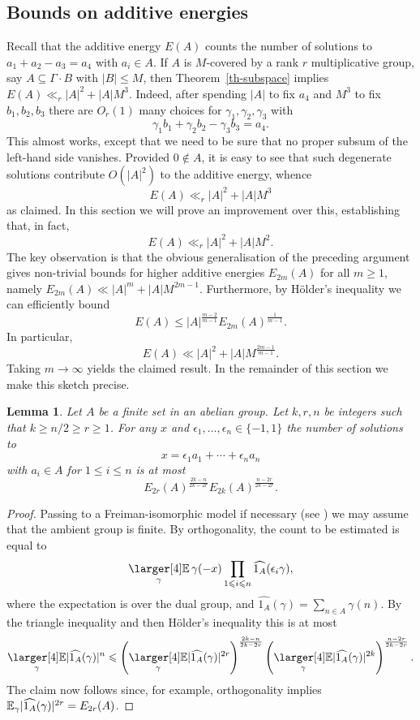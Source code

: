 \documentclass{amsart}
\renewcommand{\leq}{\leqslant}
\renewcommand{\geq}{\geqslant}
\newcommand*{\bbe}{
  \mathop{
    \mathchoice{\vcenter{\hbox{\larger[4]$\mathbb{E}$}}}
               {\kern0pt\mathbb{E}}
               {\kern0pt\mathbb{E}}
               {\kern0pt\mathbb{E}}
  }\displaylimits
}
\newcommand{\abs}[1]{\left\lvert #1\right\rvert}
\newcommand{\Abs}[1]{\lvert #1\rvert}
\newcommand{\brac}[1]{\left( #1\right)}
\newtheorem{lemma}{Lemma}
\theoremstyle{definition}
\begin{document}
\subsection{Bounds on additive energies}

Recall that the additive energy $E(A)$ counts the number of solutions to $a_1+a_2-a_3=a_4$ with $a_i\in A$. If $A$ is $M$-covered by a rank $r$ multiplicative group, say $A\subseteq \Gamma\cdot B$ with $\abs{B}\leq M$, then Theorem~\ref{th-subspace} implies $E(A)\ll_r \abs{A}^2+\abs{A}M^3$. Indeed, after spending $\abs{A}$ to fix $a_4$ and $M^3$ to fix $b_1,b_2,b_3$ there are $O_r(1)$ many choices for $\gamma_1,\gamma_2,\gamma_3$ with
\[\gamma_1b_1+\gamma_2b_2-\gamma_3b_3=a_4.\]
This almost works, except that we need to be sure that no proper subsum of the left-hand side vanishes. Provided $0\not\in A$, it is easy to see that such degenerate solutions contribute $O(\abs{A}^2)$ to the additive energy, whence
\[E(A) \ll_r \abs{A}^2+\abs{A}M^3\]
as claimed. In this section we will prove an improvement over this, establishing that, in fact,
\[E(A) \ll_r \abs{A}^2+\abs{A}M^2.\]
The key observation is that the obvious generalisation of the preceding argument gives non-trivial bounds for higher additive energies $E_{2m}(A)$ for all $m\geq 1$, namely $E_{2m}(A) \ll \abs{A}^m+\abs{A}M^{2m-1}$. Furthermore, by H\"{o}lder's inequality we can efficiently bound 
\[E(A)\leq \abs{A}^{\frac{m-2}{m-1}}E_{2m}(A)^{\frac{1}{m-1}}.\] 
In particular,
\[E(A) \ll \abs{A}^2+\abs{A}M^{\frac{2m-1}{m-1}}.\]
Taking $m\to \infty$ yields the claimed result. In the remainder of this section we make this sketch precise. 

\begin{lemma}\label{lem-energies}
Let $A$ be a finite set in an abelian group. Let $k,r,n$ be integers such that $k\geq n/2\geq r\geq 1$. For any $x$ and $\epsilon_1,\ldots,\epsilon_n\in \{-1,1\}$ the number of solutions to
\[x=\epsilon_1a_1+\cdots+\epsilon_na_n\]
with $a_i\in A$ for $1\leq i\leq n$ is at most
\[E_{2r}(A)^{\frac{2k-n}{2k-2r}}E_{2k}(A)^{\frac{n-2r}{2k-2r}}.\]
\end{lemma}
\begin{proof}
Passing to a Freiman-isomorphic model if necessary (see \cite[Chapter 5]{TaVu06}) we may assume that the ambient group is finite. By orthogonality, the count to be estimated is equal to
\[\bbe_{\gamma}  \gamma(-x)\prod_{1\leq i\leq n}\widehat{1_A}(\epsilon_i\gamma) ,\]
where the expectation is over the dual group, and $\widehat{1_A}(\gamma)=\sum_{n\in A}\gamma(n)$. By the triangle inequality and then H\"{o}lder's inequality this is at most
\[\bbe_\gamma \Abs{\widehat{1_A}(\gamma)}^n\leq \brac{\bbe_\gamma \Abs{\widehat{1_A}(\gamma)}^{2r}}^{\frac{2k-n}{2k-2r}}\brac{\bbe_\gamma \Abs{\widehat{1_A}(\gamma)}^{2k}}^{\frac{n-2r}{2k-2r}}.\]
The claim now follows since, for example, orthogonality implies $\bbe_\gamma \Abs{\widehat{1_A}(\gamma)}^{2r}=E_{2r}(A)$.
\end{proof}
\end{document}
